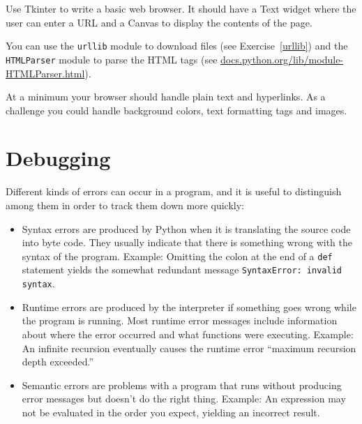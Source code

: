 \documentclass[10pt]{book}
\begin{document}
\begin{ex}

Use Tkinter to write a basic web browser.  It
should have a Text widget where the user can enter a URL
and a Canvas to display the contents of the page.


You can use the {\tt urllib} module to download files
(see Exercise~\ref{urllib}) and
the {\tt HTMLParser} module to parse the HTML
tags (see \url{docs.python.org/lib/module-HTMLParser.html}).


At a minimum your browser should handle plain text and hyperlinks.  As
a challenge you could handle background colors, text
formatting tags and images.

\end{ex}



\appendix

\chapter{Debugging}

Different kinds of errors can occur
in a program, and it is useful to distinguish among them
in order to track them down more quickly:

\begin{itemize}

\item Syntax errors are produced by Python when it is translating the
  source code into byte code.  They usually indicate that there is
  something wrong with the syntax of the program.  Example: Omitting
  the colon at the end of a {\tt def} statement yields the somewhat
  redundant message {\tt SyntaxError: invalid syntax}.

\item Runtime errors are produced by the interpreter if something goes
  wrong while the program is running.  Most runtime error messages
  include information about where the error occurred and what
  functions were executing.  Example: An infinite recursion eventually
  causes the runtime error ``maximum recursion depth exceeded.''

\item Semantic errors are problems with a program that runs without
  producing error messages but doesn't do the right thing.  Example:
  An expression may not be evaluated in the order you expect, yielding
  an incorrect result.

\end{itemize}
\end{document}
